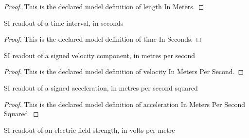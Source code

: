 \begin{proof}
  This is the declared model definition of length In Meters.
\end{proof}
\begin{definition}
  \label{def:physics:phyx-mini-0561:phyxminiproblems-problemphyxmini0561-timeinseconds}
  SI readout of a time interval, in seconds
\end{definition}
\begin{proof}
  This is the declared model definition of time In Seconds.
\end{proof}
\begin{definition}
  \label{def:physics:phyx-mini-0561:phyxminiproblems-problemphyxmini0561-velocityinmeterspersecond}
  SI readout of a signed velocity component, in metres per second
\end{definition}
\begin{proof}
  This is the declared model definition of velocity In Meters Per Second.
\end{proof}
\begin{definition}
  \label{def:physics:phyx-mini-0561:phyxminiproblems-problemphyxmini0561-accelerationinmeterspersecondsquared}
  SI readout of a signed acceleration, in metres per second squared
\end{definition}
\begin{proof}
  This is the declared model definition of acceleration In Meters Per Second Squared.
\end{proof}
\begin{definition}
  \label{def:physics:phyx-mini-0561:phyxminiproblems-problemphyxmini0561-electricfieldstrengthinvoltspermeter}
  SI readout of an electric-field strength, in volts per metre
\end{definition}
